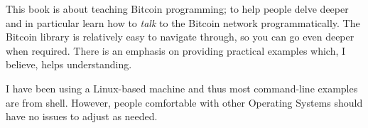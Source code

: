 This book is about teaching Bitcoin programming; to help people delve deeper and in particular learn how to \emph{talk} to the Bitcoin network programmatically. The Bitcoin library is relatively easy to navigate through, so you can go even deeper when required. There is an emphasis on providing practical examples which, I believe, helps understanding.

I have been using a Linux-based machine and thus most command-line examples are from  shell. However, people comfortable with other Operating Systems should have no issues to adjust as needed.
